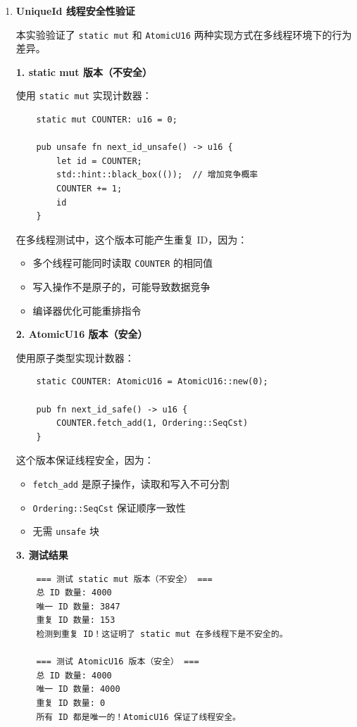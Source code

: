 \documentclass{SYSUReport}
\begin{document}
\begin{enumerate}[label=\arabic*.]
    \item \textbf{UniqueId 线程安全性验证}
    
    本实验验证了 \texttt{static mut} 和 \texttt{AtomicU16} 两种实现方式在多线程环境下的行为差异。
    
    \textbf{1. static mut 版本（不安全）}
    
    使用 \texttt{static mut} 实现计数器：
    \begin{verbatim}
    static mut COUNTER: u16 = 0;

    pub unsafe fn next_id_unsafe() -> u16 {
        let id = COUNTER;
        std::hint::black_box(());  // 增加竞争概率
        COUNTER += 1;
        id
    }
    \end{verbatim}
    
    在多线程测试中，这个版本可能产生重复 ID，因为：
    \begin{itemize}
        \item 多个线程可能同时读取 \texttt{COUNTER} 的相同值
        \item 写入操作不是原子的，可能导致数据竞争
        \item 编译器优化可能重排指令
    \end{itemize}
    
    \textbf{2. AtomicU16 版本（安全）}
    
    使用原子类型实现计数器：
    \begin{verbatim}
    static COUNTER: AtomicU16 = AtomicU16::new(0);

    pub fn next_id_safe() -> u16 {
        COUNTER.fetch_add(1, Ordering::SeqCst)
    }
    \end{verbatim}
    
    这个版本保证线程安全，因为：
    \begin{itemize}
        \item \texttt{fetch\_add} 是原子操作，读取和写入不可分割
        \item \texttt{Ordering::SeqCst} 保证顺序一致性
        \item 无需 \texttt{unsafe} 块
    \end{itemize}
    
    \textbf{3. 测试结果}
    
    \begin{verbatim}
    === 测试 static mut 版本（不安全） ===
    总 ID 数量: 4000
    唯一 ID 数量: 3847
    重复 ID 数量: 153
    检测到重复 ID！这证明了 static mut 在多线程下是不安全的。

    === 测试 AtomicU16 版本（安全） ===
    总 ID 数量: 4000
    唯一 ID 数量: 4000
    重复 ID 数量: 0
    所有 ID 都是唯一的！AtomicU16 保证了线程安全。
    \end{verbatim}
\end{enumerate}
\end{document}
